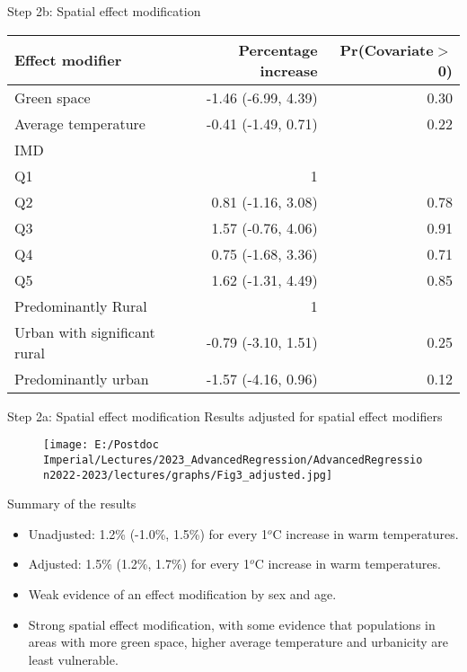 \documentclass{beamer}
\begin{document}
\begin{frame}{Step 2b: Spatial effect modification}
	\vspace{-.5cm}
	{
		\fontsize{9}{7}\selectfont
		\begin{table}[ht]
			\centering
			\begin{tabular}{lrr}
				\hline
				Effect modifier & Percentage increase & Pr(Covariate$>$0)\\ 
				\hline
				Green space & -1.46 (-6.99, 4.39) & 0.30 \\ 
				Average temperature & -0.41 (-1.49, 0.71) & 0.22  \\ 
				IMD & \\
				\hspace{0.5cm} Q1 & 1 \\
				\hspace{0.5cm} Q2 & 0.81 (-1.16, 3.08) & 0.78 \\ 
				\hspace{0.5cm} Q3 & 1.57 (-0.76, 4.06) & 0.91 \\ 
				\hspace{0.5cm} Q4 & 0.75 (-1.68, 3.36) & 0.71 \\ 
				\hspace{0.5cm} Q5 & 1.62 (-1.31, 4.49) & 0.85 \\ 
				Predominantly Rural  & 1 \\
				Urban with significant rural & -0.79 (-3.10, 1.51) & 0.25 \\ 
				Predominantly urban & -1.57 (-4.16, 0.96) & 0.12 \\ 
				\hline
			\end{tabular}
		\end{table}
	}
\end{frame}


\begin{frame}{Step 2a: Spatial effect modification}
	Results adjusted for spatial effect modifiers
	\begin{figure}
		\centering
		\texttt{[image: E:/Postdoc Imperial/Lectures/2023\_AdvancedRegression/AdvancedRegression2022-2023/lectures/graphs/Fig3\_adjusted.jpg]} 
	\end{figure}
\end{frame}


\begin{frame}{Summary of the results}
	\begin{itemize}
		\item Unadjusted: 1.2\% (-1.0\%, 1.5\%) for every 1$^o$C increase in warm temperatures.
		\item Adjusted: 1.5\% (1.2\%, 1.7\%) for every 1$^o$C increase in warm temperatures.
		\item Weak evidence of an effect modification by sex and age.
		\item Strong spatial effect modification, with some evidence that populations in areas with more green space, higher average temperature and urbanicity are least vulnerable.
	\end{itemize}
\end{frame}
\end{document}
